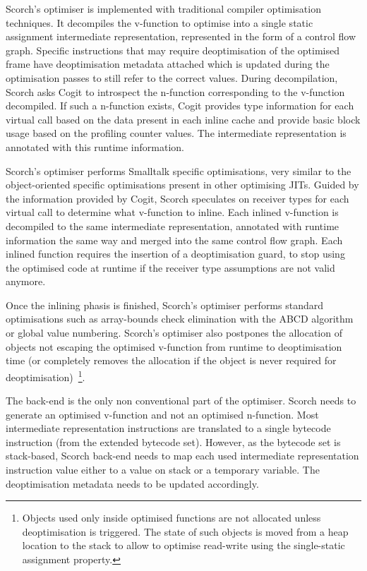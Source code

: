 \documentclass[a4paper,12pt,twoside]{../includes/ThesisStyle}
\begin{document}
Scorch's optimiser is implemented with traditional compiler optimisation techniques. It decompiles the v-function to optimise into a single static assignment intermediate representation, represented in the form of a control flow graph. Specific instructions that may require deoptimisation of the optimised frame have deoptimisation metadata attached which is updated during the optimisation passes to still refer to the correct values. During decompilation, Scorch asks Cogit to introspect the n-function corresponding to the v-function decompiled. If such a n-function exists, Cogit provides type information for each virtual call based on the data present in each inline cache and provide basic block usage based on the profiling counter values. The intermediate representation is annotated with this runtime information.


Scorch's optimiser performs Smalltalk specific optimisations, very similar to the object-oriented specific optimisations present in other optimising JITs. Guided by the information provided by Cogit, Scorch speculates on receiver types for each virtual call to determine what v-function to inline. Each inlined v-function is decompiled to the same intermediate representation, annotated with runtime information the same way and merged into the same control flow graph. Each inlined function requires the insertion of a deoptimisation guard, to stop using the optimised code at runtime if the receiver type assumptions are not valid anymore. 

Once the inlining phasis is finished, Scorch's optimiser performs standard optimisations such as array-bounds check elimination with the ABCD algorithm~\cite{Bodi00a} or global value numbering. Scorch's optimiser also postpones the allocation of objects not escaping the optimised v-function from runtime to deoptimisation time (or completely removes the allocation if the object is never required for deoptimisation)~\footnote{Objects used only inside optimised functions are not allocated unless deoptimisation is triggered. The state of such objects is moved from a heap location to the stack to allow to optimise read-write using the single-static assignment property.}.

The back-end is the only non conventional part of the optimiser. Scorch needs to generate an optimised v-function and not an optimised n-function. Most intermediate representation instructions are translated to a single bytecode instruction (from the extended bytecode set). However, as the bytecode set is stack-based, Scorch back-end needs to map each used intermediate representation instruction value either to a value on stack or a temporary variable. The deoptimisation metadata needs to be updated accordingly.
\end{document}

